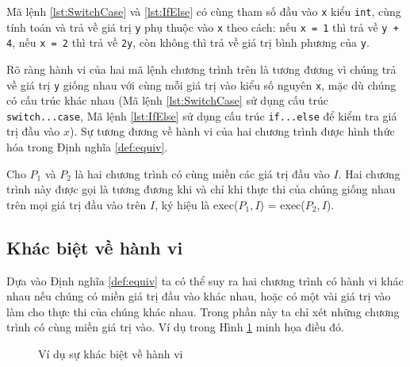 \begin{minipage}[t]{0.45\linewidth}
  
\end{minipage}%
\hfill\vrule\hfill
\begin{minipage}[t]{0.45\linewidth}
  
\end{minipage}%

Mã lệnh \ref{lst:SwitchCase} và \ref{lst:IfElse} có cùng tham số đầu vào
\texttt{x} kiểu \texttt{int}, cùng tính toán và trả về giá trị
\texttt{y} phụ thuộc vào \texttt{x} theo cách: nếu \texttt{x = 1} thì
trả về \texttt{y + 4}, nếu \texttt{x = 2} thì trả về \texttt{2y}, còn
không thì trả về giá trị bình phương của \texttt{y}.

Rõ ràng hành vi của hai mã lệnh chương trình trên là tương đương vì
chúng trả về giá trị \texttt{y} giống nhau với cùng mỗi giá trị vào
kiểu số nguyên \texttt{x}, mặc dù chúng có cấu trúc khác nhau (Mã lệnh
\ref{lst:SwitchCase} sử dụng cấu trúc \texttt{switch...case}, Mã lệnh
\ref{lst:IfElse} sử dụng cấu trúc \texttt{if...else} để kiểm tra giá
trị đầu vào $x$). Sự tương đương về hành vi của hai chương trình được
hình thức hóa trong Định nghĩa \ref{def:equiv}.

\begin{definition}
  \label{def:equiv}
  Cho $P_{1}$ và $P_{2}$ là hai chương trình có cùng miền các giá trị
  đầu vào $I$. Hai chương trình này được gọi là tương đương khi và chỉ
  khi thực thi của chúng giống nhau trên mọi giá trị đầu vào trên $I$,
  ký hiệu là exec($P_{1}, I$) = exec($P_{2}, I$).
\end{definition}
	
\subsection{Khác biệt về hành vi}

Dựa vào Định nghĩa \ref{def:equiv} ta có thể suy ra hai chương trình
có hành vi khác nhau nếu chúng có miền giá trị đầu vào khác nhau, hoặc
có một vài giá trị vào làm cho thực thi của chúng khác nhau. Trong
phần này ta chỉ xét những chương trình có cùng miền giá trị vào. Ví dụ trong Hình \ref{fig:behavioral-diff} minh họa điều đó.

\begin{figure}[h]
  \centering
  \caption{Ví dụ sự khác biệt về hành vi}
  \label{fig:behavioral-diff}
  \begin{minipage}[t]{0.45\linewidth}
    
  \end{minipage}%
\hfill\vrule\hfill
\begin{minipage}[t]{0.45\linewidth}
  
\end{minipage}%
\end{figure}

